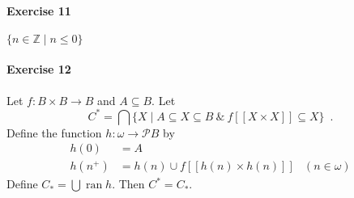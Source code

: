 \documentclass{report}
\newcommand{\ran}{\ensuremath{\operatorname{ran}}}
\begin{document}
    \paragraph{Exercise 11}
    $\{ n \in \mathbb{Z} \mid n \leq 0 \}$

    \paragraph{Exercise 12}
    Let $f : B \times B \rightarrow B$ and $A \subseteq B$. Let
    \[ C^* = \bigcap \{ X \mid A \subseteq X \subseteq B\ \&\ f[\![X \times X]\!] \subseteq X \} \enspace . \]
    Define the function $h : \omega \rightarrow \mathcal{P} B$ by
    \begin{align*}
        h(0) & = A \\
        h(n^+) & = h(n) \cup f[\![h(n) \times h(n)]\!] & (n \in \omega)
    \end{align*}
    Define $C_* = \bigcup \ran h$. Then $C^* = C_*$.
\end{document}
